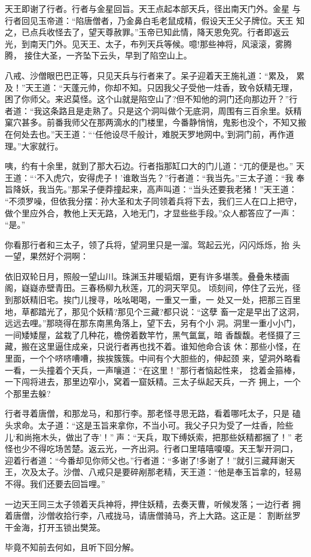 天王即谢了行者。行者与金星回旨。天王点起本部天兵，径出南天门外。金星
与行者回见玉帝道：“陷唐僧者，乃金鼻白毛老鼠成精，假设天王父子牌位。天王
知之，已点兵收怪去了，望天尊赦罪。”玉帝已知此情，降天恩免究。行者即返云
光，到南天门外。见天王、太子，布列天兵等候。噫!那些神将，风滚滚，雾腾腾，
接住大圣，一齐坠下云头，早到了陷空山上。

八戒、沙僧眼巴巴正等，只见天兵与行者来了。呆子迎着天王施礼道：“累及，
累及！”天王道：“天蓬元帅，你却不知。只因我父子受他一炷香，致令妖精无理，
困了你师父。来迟莫怪。这个山就是陷空山了?但不知他的洞门还向那边开？”行
者道：“我这条路且是走熟了。只是这个洞叫做个无底洞，周围有三百余里。妖精
窠穴甚多。前番我师父在那两滴水的门楼里，今番静悄悄，鬼影也没个，不知又搬
在何处去也。”天王道：“‘任他设尽千般计，难脱天罗地网中。’到洞门前，再作道
理。”大家就行。

咦，约有十余里，就到了那大石边。行者指那缸口大的门儿道：“兀的便是也。”
天王道：“‘不入虎穴，安得虎子！’谁敢当先？”行者道：“我当先。”三太子道：“我
奉旨降妖，我当先。”那呆子便莽撞起来，高声叫道：“当头还要我老猪！”天王道：
“不须罗噪，但依我分摆：孙大圣和太子同领着兵将下去，我们三人在口上把守，
做个里应外合，教他上天无路，入地无门，才显些些手段。”众人都答应了一声：
“是。”

你看那行者和三太子，领了兵将，望洞里只是一溜。驾起云光，闪闪烁烁，抬
头一望，果然好个洞啊：

依旧双轮日月，照般一望山川。珠渊玉井暖韬烟，更有许多堪羡。叠叠朱楼画
阁，嶷嶷赤壁青田。三春杨柳九秋莲，兀的洞天罕见。
顷刻间，停住了云光，径到那妖精旧宅。挨门儿搜寻，吆吆喝喝，一重又一重，一
处又一处，把那三百里地，草都踏光了，那见个妖精?那见个三藏?都只说：“这孽
畜一定是早出了这洞，远远去哩。”那晓得在那东南黑角落上，望下去，另有个小
洞。洞里一重小小门，一间矮矮屋，盆栽了几种花，檐傍着数竿竹，黑气氲氲，暗
香馥馥。老怪摄了三藏，搬在这里逼住成亲，只说行者再也找不着。谁知他命合该
休：那些小怪，在里面，一个个哜哜嘈嘈，挨挨簇簇。中间有个大胆些的，伸起颈
来，望洞外略看一看，一头撞着个天兵，一声嚷道：“在这里！”那行者恼起性来，
捻着金箍棒，一下闯将进去，那里边窄小，窝着一窟妖精。三太子纵起天兵，一齐
拥上，一个个那里去躲?

行者寻着唐僧，和那龙马，和那行李。那老怪寻思无路，看着哪吒太子，只是
磕头求命。太子道：“这是玉旨来拿你，不当小可。我父子只为受了一炷香，险些
儿‘和尚拖木头，做出了寺’！”声：“天兵，取下缚妖索，把那些妖精都捆了！”
老怪也少不得吃场苦楚。返云光，一齐出洞。行者口里嘻嘻嗄嗄。天王掣开洞口，
迎着行者道：“今番却见你师父也。”行者道：“多谢了!多谢了！”就引三藏拜谢天
王，次及太子。沙僧、八戒只是要碎剐那老精，天王道：“他是奉玉旨拿的，轻易
不得。我们还要去回旨哩。”

一边天王同三太子领着天兵神将，押住妖精，去奏天曹，听候发落；一边行者
拥着唐僧，沙僧收拾行李，八戒拢马，请唐僧骑马，齐上大路。这正是：
割断丝罗干金海，打开玉锁出樊笼。

毕竟不知前去何如，且听下回分解。